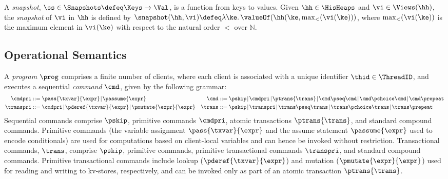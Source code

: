 \begin{definition}[Snapshots]
\label{def:heaps}
\label{def:snapshot}
A \emph{snapshot}, \( \ss \in \Snapshots  \defeq \Keys \to
\Val\),  is a function  from keys to values.
Given $\hh \in \HisHeaps$ and $\vi \in \Views(\hh)$, the \emph{snapshot} of $\vi$ in 
$\hh$ is defined by  $\snapshot(\hh, \vi) \defeq \lambda \ke \ldotp \valueOf(\hh(\ke, \max_{<}(\vi(\ke)))$, 
where $\max_{<}(\vi(\ke))$ is the maximum element in $\vi(\ke)$ with respect to the natural 
order $<$ over $\mathbb{N}$.
\end{definition}



\subsection{Operational Semantics}

A \emph{program} \( \prog \) comprises a finite number of clients,
where each client is associated with a unique identifier \( \thid \in \ThreadID \), 
and executes a sequential \emph{command} $\cmd$, given by the following grammar:
{\small
\begin{align*}
\cmdpri & ::=  
\pass{\txvar}{\expr} \!\mid\! 
\passume{\expr} 
&
\cmd & ::=  
\pskip \!\mid\!
\cmdpri \!\mid\!  
\ptrans{\trans} \!\mid\! 
\cmd \pseq \cmd \!\mid\! 
\cmd \pchoice \cmd \!\mid\! 
\cmd \prepeat  
\\
\transpri & ::= 
\cmdpri \!\mid\!
\pderef{\txvar}{\expr} \!\mid\!
\pmutate{\expr}{\expr} 
&
\trans & ::=
\pskip \!\mid\!
\transpri \!\mid\! 
\trans \pseq \trans \!\mid\!
\trans \pchoice \trans \!\mid\!
\trans\prepeat    
\end{align*} 
}
%
%
Sequential commands  comprise $\pskip$,  primitive commands $\cmdpri
$, atomic transactions
$\ptrans{\trans}$,  and standard
compound commands. 
Primitive commands (the variable assignment
$\pass{\txvar}{\expr}$ and the assume statement $\passume{\expr}$
used to encode conditionals) are used for computations based on 
client-local variables 
and can hence be invoked without restriction. 
Transactional commands, $\trans$, 
comprise $\pskip$, primitive commands, 
primitive transactional commands $\transpri$,  and standard compound commands. 
Primitive transactional commands include lookup ($\pderef{\txvar}{\expr}$) and mutation 
($\pmutate{\expr}{\expr}$) used for reading and writing to kv-stores, respectively, and  
can be invoked only as part of an atomic transaction $\ptrans{\trans}$.


